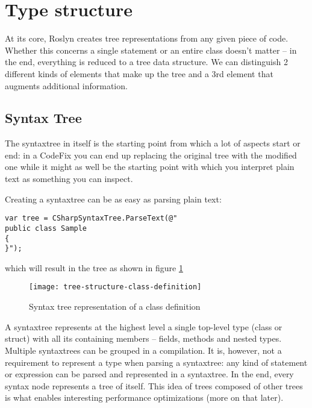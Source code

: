 \section{Type structure}
\label{sec:type-structure}

At its core, Roslyn creates tree representations from any given piece of code. Whether this concerns a single statement or an entire class doesn't matter -- in the end, everything is reduced to a tree data structure. We can distinguish 2 different kinds of elements that make up the tree and a 3rd element that augments additional information.

\subsection{Syntax Tree}
\label{sec:syntax-tree}

The \gls{syntaxtree} in itself is the starting point from which a lot of aspects start or end: in a CodeFix you can end up replacing the original tree with the modified one while it might as well be the starting point with which you interpret plain text as something you can inspect.

Creating a \gls{syntaxtree} can be as easy as parsing plain text:

\begin{lstlisting}
var tree = CSharpSyntaxTree.ParseText(@"
public class Sample
{
}");
\end{lstlisting}

which will result in the tree as shown in figure \ref{fig:tree-structure-class-definition}

\begin{figure}[h]
\centering
\texttt{[image: tree-structure-class-definition]}
\caption{Syntax tree representation of a class definition}
\label{fig:tree-structure-class-definition}
\end{figure}

A \gls{syntaxtree} represents at the highest level a single top-level type (class or struct) with all its containing members -- fields, methods and nested types. Multiple \glspl{syntaxtree} can be grouped in a compilation. It is, however, not a requirement to represent a type when parsing a \gls{syntaxtree}: any kind of statement or expression can be parsed and represented in a \gls{syntaxtree}. In the end, every syntax node represents a tree of itself. This idea of trees composed of other trees is what enables interesting performance optimizations (more on that later). 


